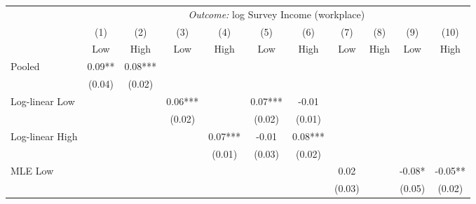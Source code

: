 {
\def\sym#1{\ifmmode^{#1}\else\(^{#1}\)\fi}
\begin{tabular}{l*{10}{c}}
\toprule
            &\multicolumn{10}{c}{\emph{Outcome:} log Survey Income (workplace)}                                                                                             \\\cmidrule(lr){2-11}
            &\multicolumn{1}{c}{(1)}&\multicolumn{1}{c}{(2)}&\multicolumn{1}{c}{(3)}&\multicolumn{1}{c}{(4)}&\multicolumn{1}{c}{(5)}&\multicolumn{1}{c}{(6)}&\multicolumn{1}{c}{(7)}&\multicolumn{1}{c}{(8)}&\multicolumn{1}{c}{(9)}&\multicolumn{1}{c}{(10)}\\
            &\multicolumn{1}{c}{Low}&\multicolumn{1}{c}{High}&\multicolumn{1}{c}{Low}&\multicolumn{1}{c}{High}&\multicolumn{1}{c}{Low}&\multicolumn{1}{c}{High}&\multicolumn{1}{c}{Low}&\multicolumn{1}{c}{High}&\multicolumn{1}{c}{Low}&\multicolumn{1}{c}{High}\\
\addlinespace\addlinespace
Pooled      &        0.09** &        0.08***&               &               &               &               &               &               &               &               \\
            &      (0.04)   &      (0.02)   &               &               &               &               &               &               &               &               \\
\addlinespace
Log-linear Low&               &               &        0.06***&               &        0.07***&       -0.01   &               &               &               &               \\
            &               &               &      (0.02)   &               &      (0.02)   &      (0.01)   &               &               &               &               \\
\addlinespace
Log-linear High&               &               &               &        0.07***&       -0.01   &        0.08***&               &               &               &               \\
            &               &               &               &      (0.01)   &      (0.03)   &      (0.02)   &               &               &               &               \\
\addlinespace
MLE Low     &               &               &               &               &               &               &        0.02   &               &       -0.08*  &       -0.05** \\
            &               &               &               &               &               &               &      (0.03)   &               &      (0.05)   &      (0.02)   \\

\end{tabular}}
